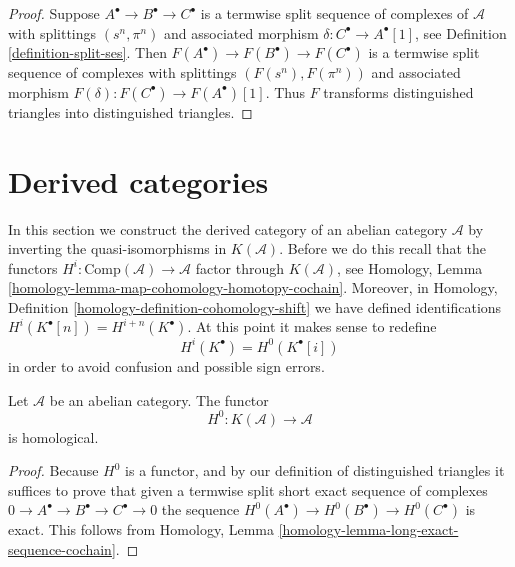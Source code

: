 \begin{proof}
Suppose $A^\bullet \to B^\bullet \to C^\bullet$
is a termwise split sequence of complexes of $\mathcal{A}$ with splittings
$(s^n, \pi^n)$ and associated morphism $\delta : C^\bullet \to A^\bullet[1]$,
see Definition \ref{definition-split-ses}. Then
$F(A^\bullet) \to F(B^\bullet) \to F(C^\bullet)$
is a termwise split sequence of complexes with splittings
$(F(s^n), F(\pi^n))$ and associated morphism
$F(\delta) : F(C^\bullet) \to F(A^\bullet)[1]$.
Thus $F$ transforms distinguished triangles into distinguished triangles.
\end{proof}




\section{Derived categories}
\label{section-derived-categories}

\noindent
In this section we construct the derived category of an abelian category
$\mathcal{A}$ by inverting the quasi-isomorphisms in $K(\mathcal{A})$.
Before we do this recall that the functors
$H^i : \text{Comp}(\mathcal{A}) \to \mathcal{A}$
factor through $K(\mathcal{A})$, see
Homology, Lemma \ref{homology-lemma-map-cohomology-homotopy-cochain}.
Moreover, in
Homology, Definition \ref{homology-definition-cohomology-shift}
we have defined identifications $H^i(K^\bullet[n]) = H^{i + n}(K^\bullet)$.
At this point it makes sense to redefine
$$
H^i(K^\bullet) = H^0(K^\bullet[i])
$$
in order to avoid confusion and possible sign errors.

\begin{lemma}
\label{lemma-cohomology-homological}
Let $\mathcal{A}$ be an abelian category. The functor
$$
H^0 : K(\mathcal{A}) \longrightarrow \mathcal{A}
$$
is homological.
\end{lemma}

\begin{proof}
Because $H^0$ is a functor, and by our definition of distinguished triangles
it suffices to prove that given a termwise split short exact sequence
of complexes $0 \to A^\bullet \to B^\bullet \to C^\bullet \to 0$
the sequence $H^0(A^\bullet) \to H^0(B^\bullet) \to H^0(C^\bullet)$
is exact. This follows from
Homology, Lemma \ref{homology-lemma-long-exact-sequence-cochain}.
\end{proof}

